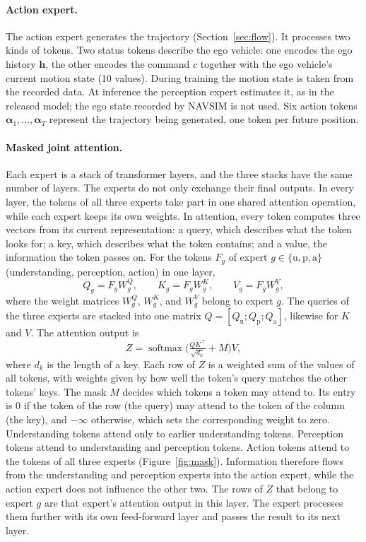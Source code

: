\documentclass[11pt, a4paper, oneside]{book}
\begin{document}
\paragraph{Action expert.} The action expert generates the trajectory
(Section~\ref{sec:flow}). It processes two kinds of tokens. Two status tokens describe the ego
vehicle: one encodes the ego history $\mathbf{h}$, the other encodes the command $c$ together
with the ego vehicle's current motion state (10 values). During training the motion state is
taken from the recorded data. At inference the perception expert estimates it, as in the
released model; the ego state recorded by NAVSIM is not used. Six action tokens
$\boldsymbol{\alpha}_1,\dots,\boldsymbol{\alpha}_T$ represent the trajectory being generated,
one token per future position.

\paragraph{Masked joint attention.}
Each expert is a stack of transformer layers, and the three stacks have the same number of
layers. The experts do not only exchange their final outputs. In every layer, the tokens of all
three experts take part in one shared attention operation, while each expert keeps its own
weights. In attention, every token computes three vectors from its current representation: a
query, which describes what the token looks for; a key, which describes what the token
contains; and a value, the information the token passes on. For the tokens $F_g$ of expert
$g\in\{\mathrm{u},\mathrm{p},\mathrm{a}\}$ (understanding, perception, action) in one layer,
\begin{equation}
  Q_g=F_gW^Q_g,\qquad K_g=F_gW^K_g,\qquad V_g=F_gW^V_g ,
\end{equation}
where the weight matrices $W^Q_g$, $W^K_g$, and $W^V_g$ belong to expert $g$. The queries of
the three experts are stacked into one matrix $Q=[Q_\mathrm{u};Q_\mathrm{p};Q_\mathrm{a}]$,
likewise for $K$ and $V$. The attention output is
\begin{equation}
  Z=\operatorname{softmax}\!\Big(\tfrac{QK^\top}{\sqrt{d_k}}+M\Big)V ,
\end{equation}
where $d_k$ is the length of a key. Each row of $Z$ is a weighted sum of the values of all
tokens, with weights given by how well the token's query matches the other tokens' keys. The
mask $M$ decides which tokens a token may attend to. Its entry is $0$ if the token of the row
(the query) may attend to the token of the column (the key), and $-\infty$ otherwise, which sets the corresponding weight to
zero. Understanding tokens attend only to earlier understanding tokens. Perception tokens attend to
understanding and perception tokens. Action tokens attend to the tokens of all three experts
(Figure~\ref{fig:mask}).
Information therefore flows from the understanding and perception experts into the action
expert, while the action expert does not influence the other two. The rows of $Z$ that belong
to expert $g$ are that expert's attention output in this layer. The expert processes them
further with its own feed-forward layer and passes the result to its next layer.
\end{document}
